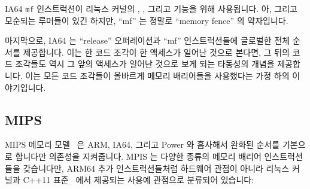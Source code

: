 IA64 {\tt mf} 인스트럭션이 리눅스 커널의 , ,
그리고  기능을 위해 사용됩니다.
아, 그리고 모순되는 루머들이 있긴 하지만, ``mf'' 는 정말로 ``memory fence'' 의
약자입니다.

마지막으로, IA64 는 ``release'' 오퍼레이션과 ``mf'' 인스트럭션들에 글로벌한
전체 순서를 제공합니다.
이는 한 코드 조각이 한 액세스가 일어난 것으로 본다면, 그 뒤의 코드 조각들도
역시 그 앞의 액세스가 일어난 것으로 보게 되는 타동성의 개념을 제공합니다.
이는 모든 코드 조각들이 올바르게 메모리 배리어들을 사용했다는 가정 하의
이야기입니다.

\subsection{MIPS}

MIPS 메모리 모델~\cite[Table 6.6]{MIPSvII-A-2015} 은 ARM, IA64, 그리고 Power 와
흡사해서 완화된 순서를 기본으로 합니다만 의존성을 지켜줍니다.
MPIS 는 다양한 종류의 메모리 배리어 인스트럭션들을 갖습니다만,  ARM64 추가
인스트럭션들처럼 하드웨어 관점이 아니라 리눅스 커널과 C++11
표준~\cite{RichardSmith2015N4527} 에서 제공되는 사용예 관점으로 분류되어
있습니다:


